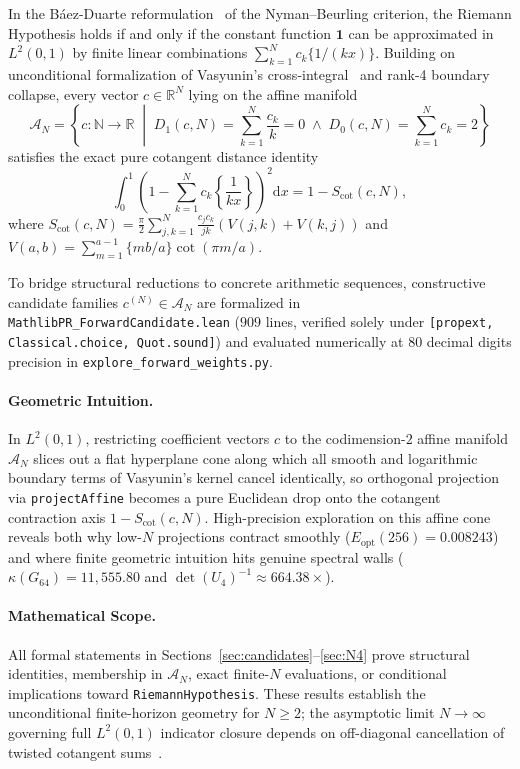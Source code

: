 \documentclass[11pt,a4paper]{article}
\theoremstyle{definition}
\newcommand{\dee}{\mathrm{d}}
\newcommand{\Nset}{\mathbb{N}}
\newcommand{\Rset}{\mathbb{R}}
\begin{document}
In the B\'aez-Duarte reformulation~\cite{BaezDuarte2003} of the Nyman--Beurling criterion, the Riemann Hypothesis holds if and only if the constant function $\mathbf{1}$ can be approximated in $L^2(0, 1)$ by finite linear combinations $\sum_{k=1}^N c_k \{1/(kx)\}$. Building on unconditional formalization of Vasyunin's cross-integral~\cite{Vasyunin1995} and rank-4 boundary collapse, every vector $c \in \Rset^N$ lying on the affine manifold
\begin{equation}\label{eq:AN_def}
\mathcal{A}_N = \left\{ c : \Nset \to \Rset \;\middle|\; D_1(c, N) = \sum_{k=1}^N \frac{c_k}{k} = 0 \;\land\; D_0(c, N) = \sum_{k=1}^N c_k = 2 \right\}
\end{equation}
satisfies the exact pure cotangent distance identity
\begin{equation}\label{eq:l2_scot}
\int_0^1 \left(1 - \sum_{k=1}^N c_k \left\{\frac{1}{kx}\right\}\right)^2 \dee x = 1 - S_{\mathrm{cot}}(c, N),
\end{equation}
where $S_{\mathrm{cot}}(c, N) = \frac{\pi}{2}\sum_{j,k=1}^N \frac{c_j c_k}{jk}(V(j, k) + V(k, j))$ and $V(a, b) = \sum_{m=1}^{a-1} \{mb/a\}\cot(\pi m/a)$.

To bridge structural reductions to concrete arithmetic sequences, constructive candidate families $c^{(N)} \in \mathcal{A}_N$ are formalized in \texttt{MathlibPR\_\allowbreak ForwardCandidate.lean} ($909$ lines, verified solely under \texttt{[propext, Classical.choice, Quot.sound]}) and evaluated numerically at $80$ decimal digits precision in \texttt{explore\_\allowbreak forward\_\allowbreak weights.py}.

\paragraph{Geometric Intuition.}
In $L^2(0, 1)$, restricting coefficient vectors $c$ to the codimension-$2$ affine manifold $\mathcal{A}_N$ slices out a flat hyperplane cone along which all smooth and logarithmic boundary terms of Vasyunin's kernel cancel identically, so orthogonal projection via \texttt{projectAffine} becomes a pure Euclidean drop onto the cotangent contraction axis $1 - S_{\mathrm{cot}}(c, N)$. High-precision exploration on this affine cone reveals both why low-$N$ projections contract smoothly ($E_{\mathrm{opt}}(256) = 0.008243$) and where finite geometric intuition hits genuine spectral walls ($\kappa(G_{64}) = 11{,}555.80$ and $\det(U_4)^{-1} \approx 664.38\times$).

\paragraph{Mathematical Scope.}
All formal statements in Sections~\ref{sec:candidates}--\ref{sec:N4} prove structural identities, membership in $\mathcal{A}_N$, exact finite-$N$ evaluations, or conditional implications toward \texttt{RiemannHypothesis}. These results establish the unconditional finite-horizon geometry for $N \ge 2$; the asymptotic limit $N \to \infty$ governing full $L^2(0, 1)$ indicator closure depends on off-diagonal cancellation of twisted cotangent sums~\cite{BettinConrey2013,BBLR2016}.
\end{document}
